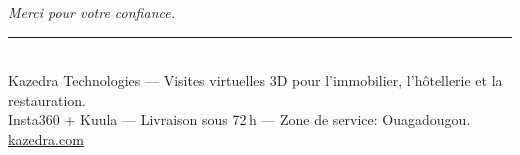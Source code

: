 \documentclass[11pt,a4paper]{article}
\begin{document}
\vspace{1cm}

\noindent
\begin{center}
{\itshape\color{kazedraDark} Merci pour votre confiance.}
\end{center}

\vfill

\noindent\textcolor{kazedraRule}{\rule{\textwidth}{0.5pt}}\\[4pt]
{\footnotesize\color{kazedraMuted}
Kazedra Technologies --- Visites virtuelles 3D pour l'immobilier, l'hôtellerie et la restauration.\\
Insta360 + Kuula --- Livraison sous 72\,h --- Zone de service: Ouagadougou. \href{https://kazedra.com}{kazedra.com}}
\end{document}
